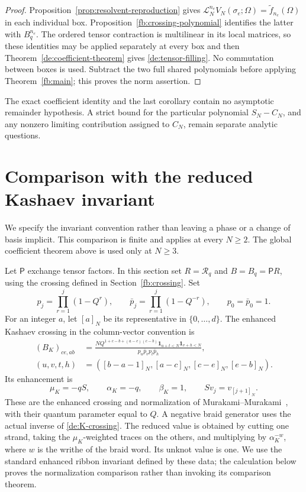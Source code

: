 \begin{proof}
Proposition~\ref{prop:resolvent-reproduction} gives
\(\mathcal L_N^{n_e}V_N(\sigma_e;\Omega)=
\widetilde f_{n_e}(\Omega)\) in each individual box.
Proposition~\ref{fb:crossing-polynomial} identifies the latter
with \(B_q^{n_e}\). The ordered tensor contraction is multilinear
in its local matrices, so these identities may be applied
separately at every box and then
Theorem~\ref{de:coefficient-theorem} gives
\eqref{de:tensor-filling}. No commutation between boxes is used.
Subtract the two full shared polynomials before applying
Theorem~\ref{fb:main}; this proves the norm assertion.
\end{proof}

The exact coefficient identity and the last corollary contain
no asymptotic remainder hypothesis. A strict bound for the
particular polynomial \(S_N-C_N\), and any nonzero limiting
contribution assigned to \(C_N\), remain separate analytic
questions.


\section{Comparison with the reduced Kashaev invariant}
\label{de:normalization-section}

We specify the invariant convention rather than leaving a phase or
a change of basis implicit. This comparison is finite and applies
at every \(N\ge2\). The global coefficient theorem above is used
only at \(N\ge3\).

Let \(\mathsf P\) exchange tensor factors. In this section set
\(R=\mathscr R_q\) and \(B=B_q=\mathsf P R\), using the
crossing defined in Section~\ref{fb:crossing}. Set
\[
 p_j=\prod_{r=1}^j(1-Q^r),\qquad
 \bar p_j=\prod_{r=1}^j(1-Q^{-r}),\qquad p_0=\bar p_0=1.
\]
For an integer \(a\), let \([a]_N\) be its representative in
\(\{0,\ldots,d\}\). The enhanced Kashaev crossing in the
column-vector convention is
\begin{equation}\label{de:K-crossing}
 \begin{aligned}
 (B_K)_{ce,ab}&=
 \frac{NQ^{1+c-b+(a-e)(c-b)}
       \mathbf1_{u+t<N}\mathbf1_{v+h<N}}
      {p_u\bar p_vp_t\bar p_h},\\
 (u,v,t,h)&=([b-a-1]_N,[a-c]_N,[c-e]_N,[e-b]_N).
 \end{aligned}
\end{equation}
Its enhancement is
\[
 \mu_K=-qS,\qquad \alpha_K=-q,\qquad \beta_K=1,
 \qquad Sv_j=v_{[j+1]_N}.
\]
These are the enhanced crossing and normalization of
Murakami--Murakami~\cite[\S\S1,4]{MurakamiMurakami2001}, with
their quantum parameter equal to \(Q\).
A negative braid generator uses the actual inverse of
\eqref{de:K-crossing}. The reduced value is obtained by cutting
one strand, taking the \(\mu_K\)-weighted traces on the others,
and multiplying by \(\alpha_K^{-w}\), where \(w\) is the
writhe of the braid word. Its unknot value is one.
We use the standard enhanced ribbon invariant defined by these
data; the calculation below proves the normalization comparison
rather than invoking its comparison theorem.

